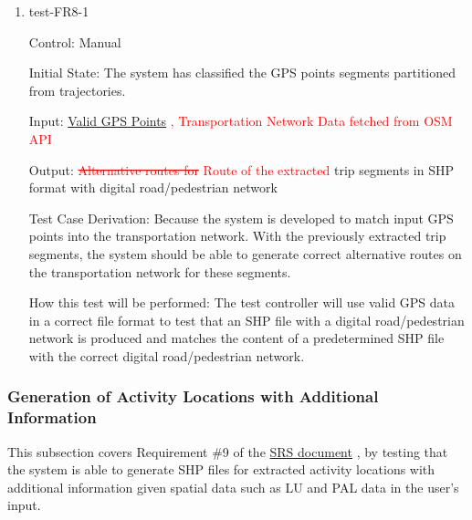 \documentclass[12pt, titlepage]{article}
\begin{document}
\begin{enumerate}

\item{test-FR8-1\\} \label{test-FR8-1}

Control: Manual 
					
Initial State: The system has classified the GPS points segments partitioned from trajectories.
					
Input: \href{https://github.com/paezha/PyERT-BLACK/blob/rev0-test/quarto-example/data/sample-gps/sample-gps-1.csv}{Valid GPS Points} \textcolor{red}{, Transportation Network Data fetched from OSM API} 
					
Output: \textcolor{red}{\sout{Alternative routes for} Route of the extracted} trip segments in SHP format with digital road/pedestrian network

Test Case Derivation: Because the system is developed to match input GPS points into the transportation network. With the previously extracted trip segments, the system should be able to generate correct alternative routes on the transportation network for these segments.
					
How this test will be performed: The test controller will use valid GPS data in a correct file format to test that an SHP file with a digital road/pedestrian network is produced and matches the content of a predetermined SHP file with the correct digital road/pedestrian network.

\end{enumerate}

\subsubsection{Generation of Activity Locations with Additional Information}

This subsection covers Requirement \#9 of the \href{https://github.com/paezha/PyERT-BLACK/blob/main/docs/SRS/SRS.pdf}{SRS document} \citep{SRS}, by testing that the system is able to generate SHP files for extracted activity locations with additional information given spatial data such as LU and PAL data in the user's input.
\end{document}
